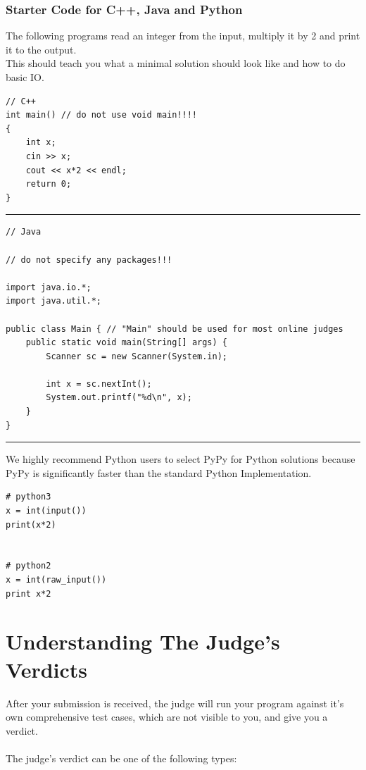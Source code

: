 \documentclass {article}
\begin{document}
\subsubsection{Starter Code for C++, Java and Python}
The following programs read an integer from the input, multiply it by 2
and print it to the output.\\
This should teach you what a minimal solution should look like
and how to do basic IO.\\
\begin{verbatim}
// C++
int main() // do not use void main!!!!
{
    int x;
    cin >> x;
    cout << x*2 << endl;
    return 0;
}
\end{verbatim}
\hrule
\begin{verbatim}
// Java

// do not specify any packages!!!

import java.io.*;
import java.util.*;

public class Main { // "Main" should be used for most online judges
    public static void main(String[] args) {
        Scanner sc = new Scanner(System.in);

        int x = sc.nextInt();
        System.out.printf("%d\n", x);
    }
}
\end{verbatim}
\hrule

\vspace{2pt}
We highly recommend Python users to select PyPy for Python solutions 
because PyPy is  significantly faster than the standard Python Implementation.

\begin{verbatim}
# python3
x = int(input())
print(x*2)


# python2
x = int(raw_input())
print x*2
\end{verbatim}

\newpage
\section{Understanding The Judge's Verdicts}
After your submission is received, the judge will run your
program against it's own comprehensive test cases, which are not 
visible to you, and give you a verdict.\\\\
The judge's verdict can be one of the following types:
\end{document}
